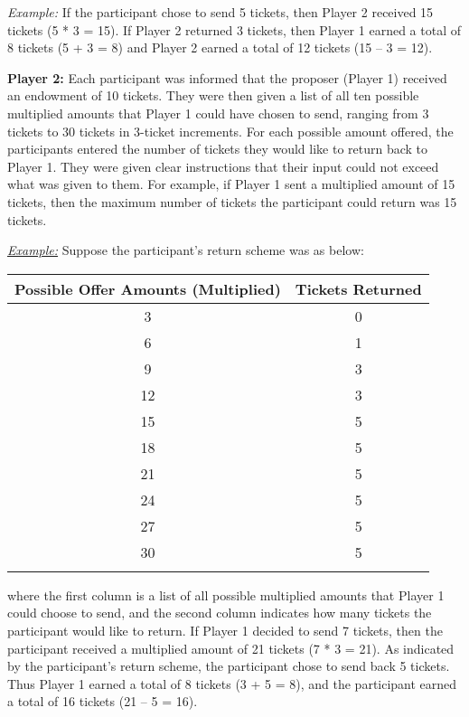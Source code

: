 \documentclass[12pt]{article}
\begin{document}
\textit{Example:} If the participant chose to send 5 tickets, then Player 2 received 15 tickets (5 * 3 = 15). If Player 2 returned 3 tickets, then Player 1 earned a total of 8 tickets (5 + 3 = 8) and Player 2 earned a total of 12 tickets (15 -- 3 = 12).

\textbf{Player 2:} Each participant was informed that the proposer (Player 1) received an endowment of 10 tickets. They were then given a list of all ten possible multiplied amounts that Player 1 could have chosen to send, ranging from 3 tickets to 30 tickets in 3-ticket increments. For each possible amount offered, the participants entered the number of tickets they would like to return back to Player 1. They were given clear instructions that their input could not exceed what was given to them. For example, if Player 1 sent a multiplied amount of 15 tickets, then the maximum number of tickets the participant could return was 15 tickets.

\underline{\textit{Example:}} Suppose the participant\rq s return scheme was as below: \\

\begin{center}
\begin{tabular}{ c c }
\hline \hline
 Possible Offer Amounts (Multiplied) & Tickets Returned \\ 
 \hline
3 & 0  \\  
6 & 1 \\  
9 & 3  \\  
12 & 3  \\  
15 & 5   \\  
18 & 5  \\  
21 & 5 \\  
24 & 5 \\  
27 & 5 \\  
30 & 5 \\  
\hline \hline \\
\end{tabular}
\end{center} 


\noindent where the first column is a list of all possible multiplied amounts that Player 1 could choose to send, and the second column indicates how many tickets the participant would like to return. If Player 1 decided to send 7 tickets, then the participant received a multiplied amount of 21 tickets (7 * 3 = 21). As indicated by the participant\rq s return scheme, the participant chose to send back 5 tickets. Thus Player 1 earned a total of 8 tickets (3 + 5 =  8), and the participant earned a total of 16 tickets (21 -- 5 = 16).
\end{document}
